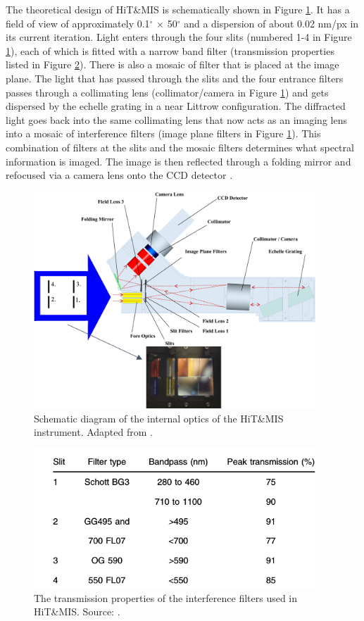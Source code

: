 \documentclass[crop=false,class=mitthesis,oneside,font=12pt]{standalone}
\begin{document}
The theoretical design of HiT\&MIS is schematically shown in Figure \ref{fig:hitmis}. It has a field of view of approximately 0.1$^\circ$ $\times$ 50$^\circ$ and a dispersion of about 0.02 nm/px in its current iteration.  Light enters through the four slits (numbered 1-4 in Figure \ref{fig:hitmis}), each of which is fitted with a narrow band filter (transmission properties listed in Figure \ref{fig:hitmis_tr}). There is also a mosaic of filter that is placed at the image plane. The light that has passed through the slits and the four entrance filters passes through a collimating lens (collimator/camera in Figure \ref{fig:hitmis}) and gets dispersed by the echelle grating in a near Littrow configuration. The diffracted light goes back into the same collimating lens that now acts as an imaging lens into a mosaic of interference filters (image plane filters in Figure \ref{fig:hitmis}). This combination of filters at the slits and the mosaic filters determines what spectral information is imaged. The image is then reflected through a folding mirror and refocused via a camera lens onto the CCD detector \citep{hitmis}.
\begin{figure}[H]
	\centering\includegraphics[width=25pc]{hitmis.png}
	\caption{Schematic diagram of the internal optics of the HiT\&MIS instrument. Adapted from \cite{hitmis}.}
	\label{fig:hitmis}
\end{figure}
\begin{figure}[H]
	\centering\includegraphics[width=25pc]{hitmis_tr.png}
	\caption{The transmission properties of the interference filters used in HiT\&MIS. Source: \cite{hitmis}.}
	\label{fig:hitmis_tr}
\end{figure}
\end{document}
